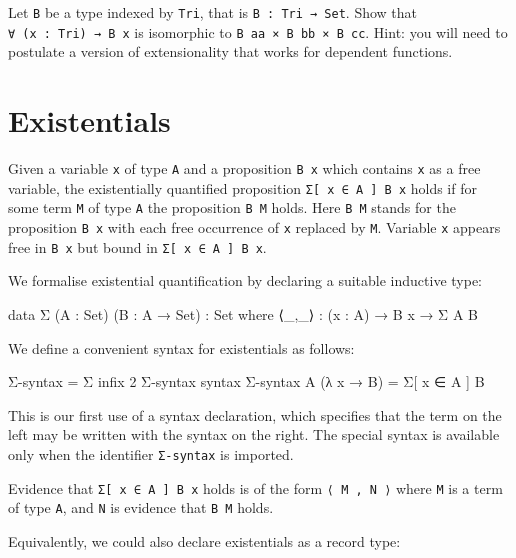 Let \texttt{B} be a type indexed by \texttt{Tri}, that is
\texttt{B\ :\ Tri\ →\ Set}. Show that \texttt{∀\ (x\ :\ Tri)\ →\ B\ x}
is isomorphic to \texttt{B\ aa\ ×\ B\ bb\ ×\ B\ cc}. Hint: you will need
to postulate a version of extensionality that works for dependent
functions.

\hypertarget{existentials}{%
\section{Existentials}\label{existentials}}

Given a variable \texttt{x} of type \texttt{A} and a proposition
\texttt{B\ x} which contains \texttt{x} as a free variable, the
existentially quantified proposition \texttt{Σ{[}\ x\ ∈\ A\ {]}\ B\ x}
holds if for some term \texttt{M} of type \texttt{A} the proposition
\texttt{B\ M} holds. Here \texttt{B\ M} stands for the proposition
\texttt{B\ x} with each free occurrence of \texttt{x} replaced by
\texttt{M}. Variable \texttt{x} appears free in \texttt{B\ x} but bound
in \texttt{Σ{[}\ x\ ∈\ A\ {]}\ B\ x}.

We formalise existential quantification by declaring a suitable
inductive type:

\begin{fence}
\begin{code}
data Σ (A : Set) (B : A → Set) : Set where
  ⟨_,_⟩ : (x : A) → B x → Σ A B
\end{code}
\end{fence}

We define a convenient syntax for existentials as follows:

\begin{fence}
\begin{code}
Σ-syntax = Σ
infix 2 Σ-syntax
syntax Σ-syntax A (λ x → B) = Σ[ x ∈ A ] B
\end{code}
\end{fence}

This is our first use of a syntax declaration, which specifies that the
term on the left may be written with the syntax on the right. The
special syntax is available only when the identifier \texttt{Σ-syntax}
is imported.

Evidence that \texttt{Σ{[}\ x\ ∈\ A\ {]}\ B\ x} holds is of the form
\texttt{⟨\ M\ ,\ N\ ⟩} where \texttt{M} is a term of type \texttt{A},
and \texttt{N} is evidence that \texttt{B\ M} holds.

Equivalently, we could also declare existentials as a record type:

